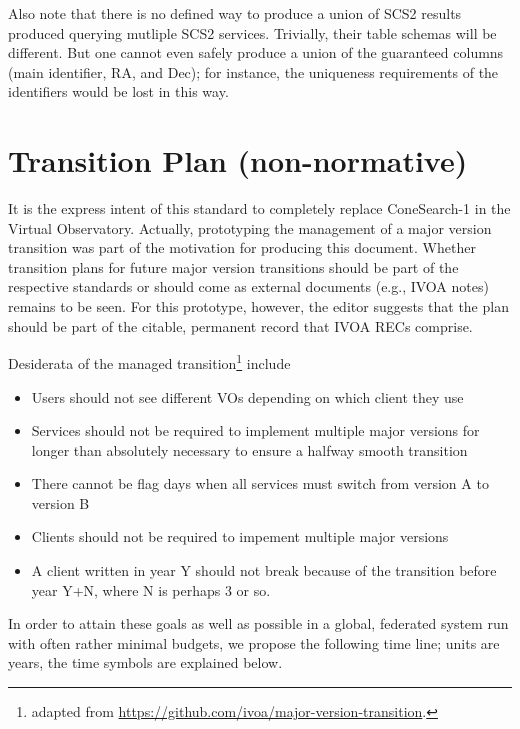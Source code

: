 \documentclass[11pt,a4paper]{ivoa}
\begin{document}
Also note that there is no defined way to produce a union of SCS2
results produced querying mutliple SCS2 services.  Trivially, their
table schemas will be different.  But one cannot even safely produce a
union of the guaranteed columns (main identifier, RA, and Dec); for
instance, the uniqueness requirements of the identifiers would be lost
in this way.


\section{Transition Plan (non-normative)}

It is the express intent of this standard to completely replace
ConeSearch-1 in the Virtual Observatory.  Actually, prototyping the
management of a major version transition was part of the motivation for
producing this document.  Whether transition plans for future major
version transitions should be part of the respective standards or should
come as external documents (e.g., IVOA notes) remains to be seen.  For
this prototype, however, the editor suggests that the plan should be
part of the citable, permanent record that IVOA RECs comprise.

Desiderata of the managed transition\footnote{adapted from
\url{https://github.com/ivoa/major-version-transition}.} include

\begin{itemize}
\item Users should not see different VOs depending on which client they
use
\item Services should not be required to implement multiple major
versions for longer than absolutely necessary to ensure a halfway smooth
transition
\item There cannot be flag days when all services must switch from
version A to version B
\item Clients should not be required to impement multiple major versions
\item A client written in year Y should not break because of the
transition before year Y+N, where N is perhaps 3 or so.
\end{itemize}

In order to attain these goals as well as possible in a global,
federated system run with often rather minimal budgets, we propose the
following time line; units are years, the time symbols are explained
below.

\def\ts#1{$T_\textrm{\textnormal{\footnotesize #1}}$}
\end{document}
